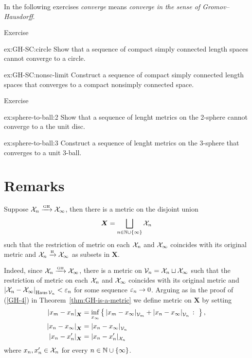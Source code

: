 In the following exercises {}\emph{converge} means {}\emph{converge in the sense of Gromov--Hausdorff}.

\begin{thm}{Exercise}\label{ex:GH-SC}
\begin{subthm}{ex:GH-SC:circle}
Show that a sequence of compact simply connected length spaces cannot converge to a circle.
\end{subthm}

\begin{subthm}{ex:GH-SC:nonsc-limit}
Construct a sequence of compact simply connected length spaces that converges to a compact nonsimply connected space.
\end{subthm}
\end{thm}

\begin{thm}{Exercise}\label{ex:sphere-to-ball}
\begin{subthm}{ex:sphere-to-ball:2}
Show that a sequence of lenght metrics on the 2-sphere cannot converge to a the unit disc.
\end{subthm}

\begin{subthm}{ex:sphere-to-ball:3}
Construct a sequence of lenght metrics on the 3-sphere that converges to a unit 3-ball.
\end{subthm}

\end{thm}

\section{Remarks}

Suppose $\mathcal{X}_n\xrightarrow{\mbox{\tiny\rm GH}} \mathcal{X}_\infty$, then there is a metric on the disjoint union 
\[\bm{X}=\bigsqcup_{n\in \mathbb{N}\cup\{\infty\}} \mathcal{X}_n\]
such that the restriction of metric on each $\mathcal{X}_n$ and $\mathcal{X}_\infty$ coincides with its original metric and $\mathcal{X}_n\xrightarrow{\mbox{\tiny\rm H}} \mathcal{X}_\infty$ as subsets in $\bm{X}$.

Indeed, since $\mathcal{X}_n\xrightarrow{\mbox{\tiny\rm GH}} \mathcal{X}_\infty$, there is a metric on $\mathcal{V}_n=\mathcal{X}_n\sqcup \mathcal{X}_\infty$ such that the restriction of metric on each $\mathcal{X}_n$ and $\mathcal{X}_\infty$ coincides with its original metric and $\dist{\spc{X}_n}{\spc{X}_\infty}{\Haus\spc{V}_n}<\eps_n$ for some sequence $\varepsilon_n\to 0$.
Arguing as in the proof of (\ref{GH-4}) in Theorem~\ref{thm:GH-is-a-metric}
we define metric on $\bm{X}$ by setting 
\begin{align*}
\dist{x_m}{x_n}{\bm{X}}&=\inf_{x_\infty}\set{\dist{x_m}{x_\infty}{\spc{V}_m}+\dist{x_n}{x_\infty}{\spc{V}_n}}{},
\\
\dist{x_n}{x_\infty}{\bm{X}}&=\dist{x_n}{x_\infty}{\spc{V}_n}
\\
\dist{x_n}{x'_n}{\bm{X}}&=\dist{x_n}{x_n'}{\spc{X}_n}
\end{align*}
where $x_n,x_n'\in\mathcal{X}_n$ for every $n\in \mathbb{N}\cup\{\infty\}$.

